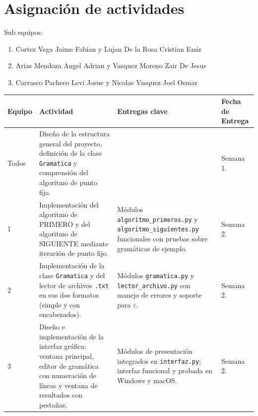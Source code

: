 \section{Asignación de actividades}

Sub equipos:
\begin{enumerate}
  \item Cortez Vega Jaime Fabian y Lujan De la Rosa Cristian Emir
  \item Arias Mendoza Angel Adrian y Vasquez Moreno Zair De Jesus
  \item Carrasco Pacheco Levi Josue y Nicolas Vasquez Joel Osmar
\end{enumerate}

\vspace{0.5cm}

\begin{longtable}{|P{1.8cm}|P{4.2cm}|P{4.2cm}|P{3.2cm}|}
\hline
{}
{\color{white}\textbf{Equipo}} &
{\color{white}\textbf{Actividad}} &
{\color{white}\textbf{Entregas clave}} &
{\color{white}\textbf{Fecha de Entrega}} \\
\hline
\endhead

Todos &
Diseño de la estructura general del proyecto, definición de la clase \texttt{Gramatica} y
comprensión del algoritmo de punto fijo. &
 &
Semana 1. \\
\hline

1 &
Implementación del algoritmo de PRIMERO y del algoritmo de SIGUIENTE mediante iteración de
punto fijo. &
Módulos \texttt{algoritmo\_primeros.py} y \texttt{algoritmo\_siguientes.py} funcionales con
pruebas sobre gramáticas de ejemplo. &
Semana 2. \\
\hline

2 &
Implementación de la clase \texttt{Gramatica} y del lector de archivos \texttt{.txt} en sus
dos formatos (simple y con encabezados). &
Módulos \texttt{gramatica.py} y \texttt{lector\_archivo.py} con manejo de errores y soporte
para $\varepsilon$. &
Semana 2. \\
\hline

3 &
Diseño e implementación de la interfaz gráfica: ventana principal, editor de gramática con
numeración de líneas y ventana de resultados con pestañas. &
Módulos de presentación integrados en \texttt{interfaz.py}; interfaz funcional y probada en
Windows y macOS. &
Semana 2. \\
\hline

\end{longtable}

